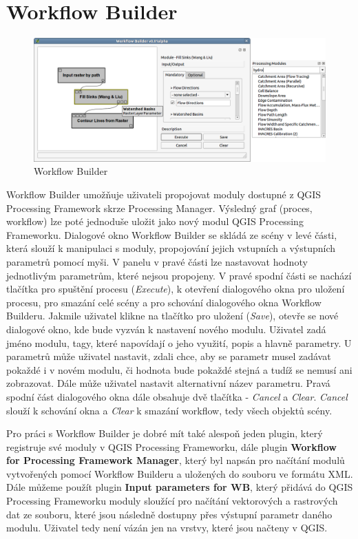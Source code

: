 \newpage
\chapter{Workflow Builder}

\begin{figure}[h]
	\centering
	\includegraphics[scale=0.38]{pictures/wf/wf_pm}
	\caption{Workflow Builder}
  	\label{wf}
\end{figure}

Workflow Builder umožňuje uživateli propojovat moduly dostupné z QGIS Processing Framework skrze Processing Manager. Výsledný graf (proces, workflow) lze poté jednoduše uložit jako nový modul QGIS Processing Frameworku. Dialogové okno Workflow Builder se skládá ze scény v levé části, která slouží k manipulaci s moduly, propojování jejich vstupních a výstupních parametrů pomocí myši. V panelu v pravé části lze nastavovat hodnoty jednotlivým parametrům, které nejsou propojeny. V pravé spodní části se nachází tlačítka pro spuštění procesu (\textit{Execute}), k otevření dialogového okna pro uložení procesu, pro smazání celé scény a pro schování dialogového okna Workflow Builderu. Jakmile uživatel klikne na tlačítko pro uložení (\textit{Save}), otevře se nové dialogové okno, kde bude vyzván k nastavení nového modulu. Uživatel zadá jméno modulu, tagy, které napovídají o jeho využití, popis a hlavně parametry. U parametrů může uživatel nastavit, zdali chce, aby se parametr musel zadávat pokaždé i v novém modulu, či hodnota bude pokaždé stejná a tudíž se nemusí ani zobrazovat. Dále může uživatel nastavit alternativní název parametru. Pravá spodní část dialogového okna dále obsahuje dvě tlačítka - \textit{Cancel} a \textit{Clear}. \textit{Cancel} slouží k schování okna a \textit{Clear} k smazání workflow, tedy všech objektů scény.

Pro práci s Workflow Builder je dobré mít také alespoň jeden plugin, který registruje své moduly v QGIS Processing Frameworku, dále plugin \textbf{Workflow for Processing Framework Manager}, který byl napsán pro načítání modulů vytvořených pomocí Workflow Builderu a uložených do souboru ve formátu XML. Dále můžeme použít plugin \textbf{Input parameters for WB}, který přidává do QGIS Processing Frameworku moduly sloužící pro načítání vektorových a rastrových dat ze souboru, které jsou následně dostupny přes výstupní parametr daného modulu. Uživatel tedy není vázán jen na vrstvy, které jsou načteny v QGIS.\\

